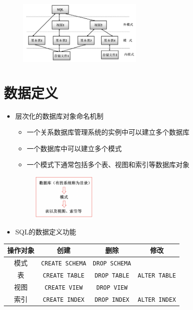 \begin{figure}[H]
    \vspace{-0.5em}
	\centering
	\includegraphics[width=0.55\textwidth]{images/3.1}
    \vspace{-1em}
\end{figure}

\section{数据定义}
\begin{itemize}
    \item 层次化的数据库对象命名机制
    \begin{itemize}
        \item 一个关系数据库管理系统的实例中可以建立多个数据库
        \item 一个数据库中可以建立多个模式
        \item 一个模式下通常包括多个表、视图和索引等数据库对象
    \end{itemize}
    \begin{figure}[H]
        \vspace{-0.5em}
        \centering
        \includegraphics[width=0.3\textwidth]{images/3.2}
        \vspace{-1em}
    \end{figure}
    \item SQL的数据定义功能
\end{itemize}

\begin{table}[H]
    \vspace{-0.5em}
    \centering
    \begin{tabular}{|c|c|c|c|}
    \hline
    \textbf{操作对象} & \textbf{创建}   & \textbf{删除} & \textbf{修改} \\ \hline
    模式            & \verb|CREATE SCHEMA| & \verb|DROP SCHEMA| &             \\ \hline
    表             & \verb|CREATE TABLE|  & \verb|DROP TABLE|  & \verb|ALTER TABLE| \\ \hline
    视图            & \verb|CREATE VIEW|  & \verb|DROP VIEW|  &             \\ \hline
    索引            & \verb|CREATE INDEX|  & \verb|DROP INDEX|  & \verb|ALTER INDEX|\\ \hline
    \end{tabular}
    \vspace{-1em}
\end{table}


